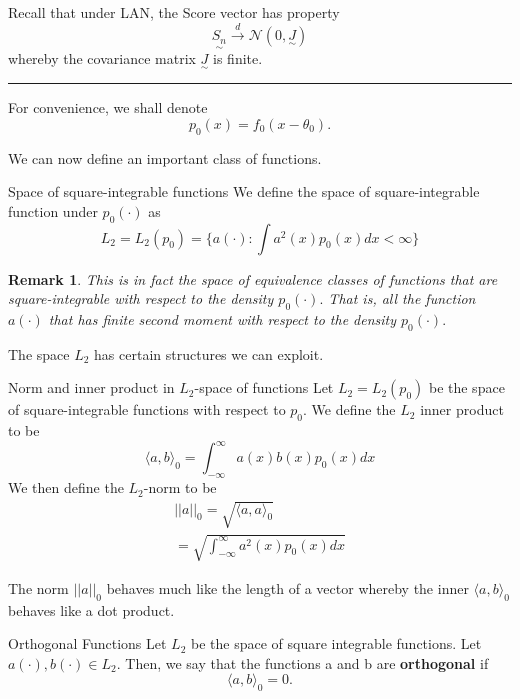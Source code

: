 \documentclass[twoside]{article}
\newtheorem{remark}[theorem]{Remark}
\newenvironment{proof}{{\bf Proof:}}{\hfill\rule{2mm}{2mm}}
\newcommand{\utilde}{\underset{\sim}}
\begin{document}
\begin{proof} Recall that under LAN, the Score vector has property 
$$
\utilde{S_{n}} \xrightarrow{d} \mathcal{N}(0, \utilde{J})
$$
whereby the covariance matrix $\utilde{J}$ is finite.
\end{proof}

For convenience, we shall denote 
$$
p_0(x) = f_0(x - \theta_0).
$$

We can now define an important class of functions. 

\begin{definition_exam}{Space of square-integrable functions}{} We define the space of square-integrable function under $p_0(\cdot)$ as 
\begin{equation}
  L_2 = L_2(p_0) = \{a(\cdot): \int a^2(x)p_0(x)dx < \infty\}
\end{equation}
\end{definition_exam}

\begin{remark} This is in fact the space of equivalence classes of functions that are square-integrable with respect to the density $p_0(\cdot).$ That is, all the function $a(\cdot)$ that has finite second moment with respect to the density $p_0(\cdot).$
\end{remark}

The space $L_2$ has certain structures we can exploit. 

\begin{proposition_exam}{Norm and inner product in $L_2$-space of functions}{} Let $L_2 = L_2(p_0)$ be the space of square-integrable functions with respect to $p_0$. We define the $L_2$ inner product to be 
\begin{equation}
  \langle a, b \rangle_0 = \int_{-\infty}^{\infty}a(x)b(x)p_0(x)dx
\end{equation}
We then define the $L_2$-norm to be 
\begin{align}
||a||_0 = \sqrt{\langle a, a \rangle_0}
\\ = \sqrt{ \int_{-\infty}^{\infty}a^2(x)p_0(x)dx}
\end{align}
\end{proposition_exam}


The norm $||a||_0$ behaves much like the length of a vector whereby the inner $\langle a, b \rangle_0$ behaves like a dot product.

\begin{definition_exam}{Orthogonal Functions}{} Let $L_2$ be the space of square integrable functions. Let $a(\cdot), b(\cdot) \in L_2.$ Then, we say that the functions a and b are \textbf{orthogonal} if 
\begin{equation}
  \langle a, b \rangle_0 = 0.
\end{equation}
\end{definition_exam}
\end{document}

